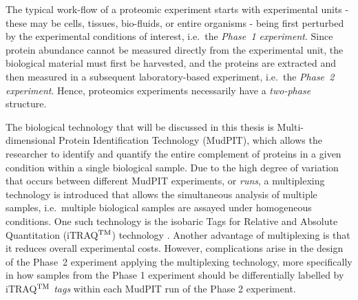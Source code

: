 The typical work-flow of a proteomic experiment starts with experimental units - these may be cells, tissues, bio-fluids, or entire organisms - being first perturbed by the experimental conditions of interest, i.e.\ the \emph{Phase~1 experiment}. Since protein abundance cannot be measured directly from the experimental unit, the biological material must first be harvested, and the proteins are extracted and then measured in a subsequent laboratory-based experiment, i.e.\ the \emph{Phase~2 experiment}. Hence, proteomics experiments necessarily have a \emph{two-phase} structure.
 
The biological technology that will be discussed in this thesis is Multi-dimensional Protein Identification Technology (MudPIT), which allows the researcher to identify and quantify the entire complement of proteins in a given condition within a single biological sample. Due to the high degree of variation that occurs between different MudPIT experiments, or \emph{runs}, a multiplexing technology is introduced that allows the simultaneous analysis of multiple samples, i.e.\ multiple biological samples are assayed under homogeneous conditions. One such technology is the isobaric Tags for Relative and Absolute Quantitation (iTRAQ$^{\rm TM}$) technology \citep{Ross2004}. Another advantage of multiplexing is that it reduces overall experimental costs. However, complications arise in the design of the Phase~2 experiment applying the multiplexing technology, more specifically in how samples from the Phase 1 experiment should be differentially labelled by iTRAQ$^{\rm TM}$ \emph{tags} within each MudPIT run of the Phase 2 experiment. 

